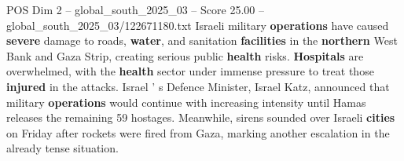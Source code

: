 \begin{textsample}{POS Dim 2 – global\_south\_2025\_03 – Score 25.00 – global\_south\_2025\_03/122671180.txt}
Israeli military \textbf{operations} have caused \textbf{severe} damage to roads, \textbf{water}, and sanitation \textbf{facilities} in the \textbf{northern} West Bank and Gaza Strip, creating serious public \textbf{health} risks. \textbf{Hospitals} are overwhelmed, with the \textbf{health} sector under immense pressure to treat those \textbf{injured} in the attacks.
Israel ' s Defence Minister, Israel Katz, announced that military \textbf{operations} would continue with increasing intensity until Hamas releases the remaining 59 hostages.
Meanwhile, sirens sounded over Israeli \textbf{cities} on Friday after rockets were fired from Gaza, marking another escalation in the already tense situation.

\end{textsample}
